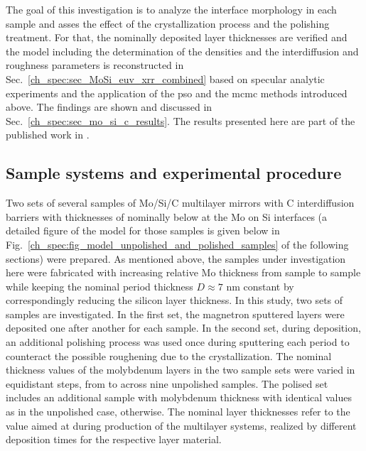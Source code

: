 The goal of this investigation is to analyze the interface morphology in each sample and asses the effect of the crystallization process and the polishing treatment. For that, the nominally deposited layer thicknesses are verified and the model including the determination of the densities and the interdiffusion and roughness parameters is reconstructed in Sec.~\ref{ch_spec:sec_MoSi_euv_xrr_combined} based on specular analytic experiments and the application of the \gls{pso} and the \gls{mcmc} methods introduced above. The findings are shown and discussed in Sec.~\ref{ch_spec:sec_mo_si_c_results}. The results presented here are part of the published work in .

\subsection{Sample systems and experimental procedure} \label{ch_spec:sec_mo_si_c_sample_systems_and_experimental}
Two sets of several samples of Mo/Si/C multilayer mirrors with C interdiffusion barriers with thicknesses of nominally below  at the Mo on Si interfaces (a detailed figure of the model for those samples is given below in Fig.~\ref{ch_spec:fig_model_unpolished_and_polished_samples} of the following sections) were prepared. As mentioned above, the samples under investigation here were fabricated with increasing relative Mo thickness from sample to sample while keeping the nominal period thickness $D\approx 7$ nm constant by correspondingly reducing the silicon layer thickness. In this study, two sets of samples are investigated. In the first set, the magnetron sputtered layers were deposited one after another for each sample. In the second set, during deposition, an additional polishing process was used once during sputtering each period to counteract the possible roughening due to the crystallization. The nominal thickness values of the molybdenum layers in the two sample sets were varied in equidistant steps, from  to  across nine unpolished samples. The polised set includes an additional sample with  molybdenum thickness with identical values as in the unpolished case, otherwise. The nominal layer thicknesses refer to the value aimed at during production of the multilayer systems, realized by different deposition times for the respective layer material.


